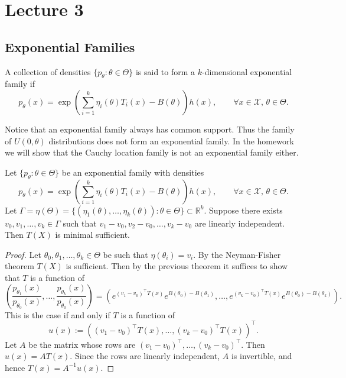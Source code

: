 \newpage

\section{Lecture 3}

\subsection{Exponential Families}

\begin{definition}
	A collection of densities $\{p_\theta : \theta \in \Theta \}$ is said to form a $k$-dimensional exponential family if \[
	p_\theta(x) = \exp\left(\sum_{i=1}^k \eta_i(\theta)T_i(x) - B(\theta) \right) h(x), \qquad \forall x \in \mathcal X, \, \theta \in \Theta.
	\]
\end{definition}

\begin{remark}
	Notice that an exponential family always has common support. Thus the family of $U(0, \theta)$ distributions does not form an exponential family. In the homework we will show that the Cauchy location family is not an exponential family either. 
\end{remark}

\begin{theorem}
	Let $\{p_\theta : \theta \in \Theta \}$ be an exponential family with densities \[
	p_\theta(x) = \exp\left(\sum_{i=1}^k \eta_i(\theta)T_i(x) - B(\theta) \right) h(x), \qquad \forall x \in \mathcal X, \, \theta \in \Theta.
	\] Let $\Gamma = \eta(\Theta) = \{(\eta_1(\theta), \dots, \eta_k(\theta)) : \theta \in \Theta \} \subset \mathbb R^k$. Suppose there exists $v_0, v_1, \dots, v_k \in \Gamma$ such that $v_1 - v_0, v_2 - v_0, \dots, v_k - v_0$ are linearly independent. Then $T(X)$ is minimal sufficient. 
\end{theorem}

\begin{proof}
	Let $\theta_0, \theta_1, \dots, \theta_k \in \Theta$ be such that $\eta(\theta_i) = v_i$. By the Neyman-Fisher theorem $T(X)$ is sufficient. Then by the previous theorem it suffices to show that $T$ is a function of \[
	\left( \frac{p_{\theta_1}(x)}{p_{\theta_0}(x)},\dots,\frac{p_{\theta_k}(x)}{p_{\theta_0}(x)} \right)  = 
	\left( e^{(v_1 - v_0)^\top T(x)} e^{B(\theta_0) - B(\theta_1)},\dots,e^{(v_k - v_0)^\top T(x)} e^{B(\theta_0) - B(\theta_k)} \right).
	\] This is the case if and only if $T$ is a function of
	\[
	u(x):=
	\left(
	(v_1-v_0)^\top T(x),\dots,(v_k-v_0)^\top T(x)
	\right)^\top .
	\]
	Let $A$ be the matrix whose rows are
	$(v_1-v_0)^\top,\dots,(v_k-v_0)^\top$. Then $u(x)=AT(x)$.
	Since the rows are linearly independent, $A$ is invertible, and hence
	$T(x)=A^{-1}u(x)$.
\end{proof}

